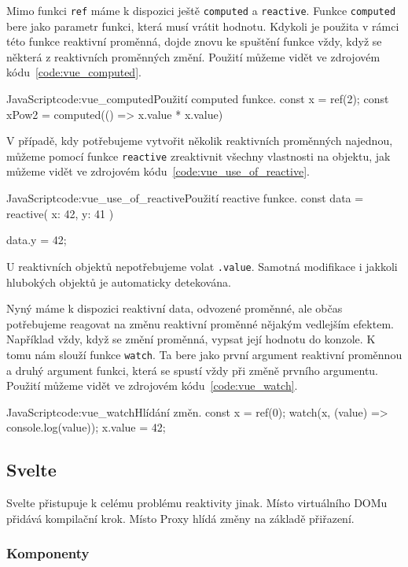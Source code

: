 \documentclass[
  master,
  program=ainf,
  tables=false,
  sourcecodes,
  glossaries,
  index
]{kidiplom}
\begin{document}
Mimo funkci {\tt ref} máme k dispozici ještě {\tt computed} a {\tt reactive}. Funkce {\tt computed} bere jako parametr
funkci, která musí vrátit hodnotu. Kdykoli je použita v rámci této funkce reaktivní proměnná, 
dojde znovu ke spuštění funkce vždy, když se některá z reaktivních proměnných změní.
Použití můžeme vidět ve zdrojovém kódu~\ref{code:vue_computed}.

\begin{kicode}{JavaScript}{code:vue_computed}{Použití computed funkce.}
  const x = ref(2);
  const xPow2 = computed(() => x.value * x.value)
\end{kicode}

V případě, kdy potřebujeme vytvořit několik reaktivních proměnných najednou, můžeme pomocí
funkce {\tt reactive} zreaktivnit všechny vlastnosti na objektu, jak můžeme vidět ve zdrojovém kódu~\ref{code:vue_use_of_reactive}.

\begin{kicode}{JavaScript}{code:vue_use_of_reactive}{Použití reactive funkce.}
  const data = reactive({
    x: 42,
    y: 41
  })

  data.y = 42;
\end{kicode}

U reaktivních objektů nepotřebujeme volat {\tt .value}. Samotná modifikace i jakkoli hlubokých
objektů je automaticky detekována. 

Nyný máme k dispozici reaktivní data, odvozené proměnné, ale občas potřebujeme reagovat
na změnu reaktivní proměnné nějakým vedlejším efektem. Například vždy, když se změní
proměnná, vypsat její hodnotu do konzole. K tomu nám slouží funkce {\tt watch}. Ta bere jako 
první argument reaktivní proměnnou a druhý argument funkci, která se spustí vždy při změně
prvního argumentu. Použití můžeme vidět ve zdrojovém kódu~\ref{code:vue_watch}.

\begin{kicode}{JavaScript}{code:vue_watch}{Hlídání změn.}
  const x = ref(0);
  watch(x, (value) => console.log(value));
  x.value = 42;
\end{kicode}

\subsection{Svelte}
Svelte \cite{svelte} přistupuje k celému problému reaktivity jinak. Místo virtuálního DOMu přidává kompilační
krok. Místo Proxy \cite{proxy} hlídá změny na základě přiřazení.

\subsubsection{Komponenty}
\end{document}
